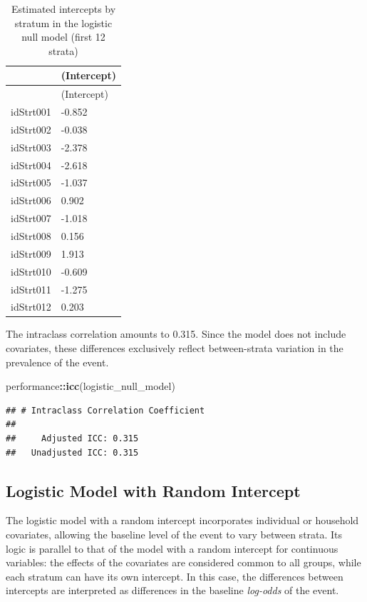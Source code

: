 \documentclass[
  english,
  12pt,
]{book}
\newenvironment{Shaded}{\begin{snugshade}}{\end{snugshade}}
\newcommand{\FunctionTok}[1]{\textcolor[rgb]{0.13,0.29,0.53}{\textbf{#1}}}
\newcommand{\NormalTok}[1]{#1}
\newcommand{\SpecialCharTok}[1]{\textcolor[rgb]{0.81,0.36,0.00}{\textbf{#1}}}
\begin{document}
\begin{longtable}[]{@{}ll@{}}
\caption{\label{tab:tab-coef-logit-nulo}Estimated intercepts by stratum in the logistic null model (first 12 strata)}\tabularnewline
\toprule\noalign{}
& (Intercept) \\
\midrule\noalign{}
\endfirsthead
\toprule\noalign{}
& (Intercept) \\
\midrule\noalign{}
\endhead
\bottomrule\noalign{}
\endlastfoot
idStrt001 & -0.852 \\
idStrt002 & -0.038 \\
idStrt003 & -2.378 \\
idStrt004 & -2.618 \\
idStrt005 & -1.037 \\
idStrt006 & 0.902 \\
idStrt007 & -1.018 \\
idStrt008 & 0.156 \\
idStrt009 & 1.913 \\
idStrt010 & -0.609 \\
idStrt011 & -1.275 \\
idStrt012 & 0.203 \\
\end{longtable}

The intraclass correlation amounts to 0.315. Since the model does not include covariates, these differences exclusively reflect between-strata variation in the prevalence of the event.

\begin{Shaded}
\begin{Highlighting}[]
\NormalTok{performance}\SpecialCharTok{::}\FunctionTok{icc}\NormalTok{(logistic\_null\_model)}
\end{Highlighting}
\end{Shaded}

\begin{verbatim}
## # Intraclass Correlation Coefficient
## 
##     Adjusted ICC: 0.315
##   Unadjusted ICC: 0.315
\end{verbatim}

\subsection{Logistic Model with Random Intercept}\label{modelo-logistico-con-intercepto-aleatorio}

The logistic model with a random intercept incorporates individual or household covariates, allowing the baseline level of the event to vary between strata. Its logic is parallel to that of the model with a random intercept for continuous variables: the effects of the covariates are considered common to all groups, while each stratum can have its own intercept. In this case, the differences between intercepts are interpreted as differences in the baseline \emph{log-odds} of the event.
\end{document}
